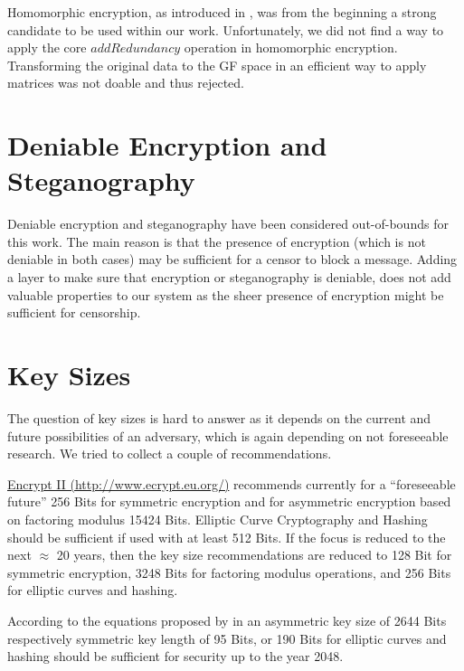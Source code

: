 Homomorphic encryption, as introduced in \cite{feldman1987practical}, was from the beginning a strong candidate to be used within our work. Unfortunately, we did not find a way to apply the core $addRedundancy$ operation in homomorphic encryption. Transforming the original data to the GF space in an efficient way to apply matrices was not doable and thus rejected.


\section{Deniable Encryption and Steganography}

Deniable encryption and steganography have been considered out-of-bounds for this work. The main reason is that the presence of encryption (which is not deniable in both cases) may be sufficient for a censor to block a message. Adding a layer to make sure that encryption or steganography is deniable, does not add valuable properties to our system as the sheer presence of encryption might be sufficient for censorship. 

\section{Key Sizes\label{sec:keySize}}

The question of key sizes is hard to answer as it depends on the current and future possibilities of an adversary, which is again depending on not foreseeable research. We tried to collect a couple of recommendations.

\href{http://www.ecrypt.eu.org/}{Encrypt II (http://www.ecrypt.eu.org/)} recommends currently for a ``foreseeable future'' 256 Bits for symmetric encryption and for asymmetric encryption based on factoring modulus 15424 Bits. Elliptic Curve Cryptography and Hashing should be sufficient if used with at least 512 Bits. If the focus is reduced to the next $\approx$ 20 years, then the key size recommendations are reduced to 128 Bit for symmetric encryption, 3248 Bits for factoring modulus operations, and 256 Bits for elliptic curves and hashing.

According to the equations proposed by \citeauthor{Lenstra04keylength.} in \cite{Lenstra04keylength.} an asymmetric key size of 2644 Bits respectively symmetric key length of 95 Bits, or 190 Bits for elliptic curves and hashing should be sufficient for security up to the year 2048. 

